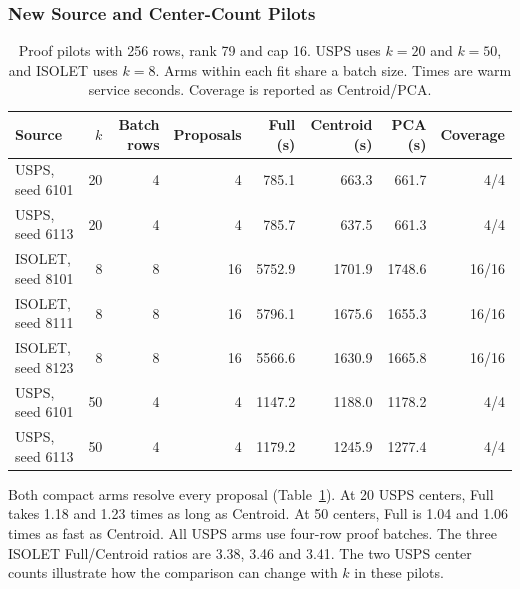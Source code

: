 \documentclass[5p,times,twocolumn]{elsarticle}
\begin{document}
\subsubsection{New Source and Center-Count Pilots}
\begin{table}[!t]
\centering\small
\caption{Proof pilots with 256 rows, rank 79 and cap 16.
USPS uses $k=20$ and $k=50$, and ISOLET uses $k=8$.
Arms within each fit share a batch size. Times are warm service seconds.
Coverage is reported as Centroid/PCA.}
\label{tab:new-fit-pilots}
\begin{tabular}{@{}lrrrrrrr@{}}\toprule
Source & $k$ & Batch rows & Proposals & Full (s) & Centroid (s) & PCA (s) & Coverage\\\midrule
USPS, seed 6101 & 20 & 4 & 4 & 785.1 & 663.3 & 661.7 & 4/4\\
USPS, seed 6113 & 20 & 4 & 4 & 785.7 & 637.5 & 661.3 & 4/4\\
ISOLET, seed 8101 & 8 & 8 & 16 & 5752.9 & 1701.9 & 1748.6 & 16/16\\
ISOLET, seed 8111 & 8 & 8 & 16 & 5796.1 & 1675.6 & 1655.3 & 16/16\\
ISOLET, seed 8123 & 8 & 8 & 16 & 5566.6 & 1630.9 & 1665.8 & 16/16\\
USPS, seed 6101 & 50 & 4 & 4 & 1147.2 & 1188.0 & 1178.2 & 4/4\\
USPS, seed 6113 & 50 & 4 & 4 & 1179.2 & 1245.9 & 1277.4 & 4/4\\
\bottomrule\end{tabular}
\end{table}

Both compact arms resolve every proposal
(Table~\ref{tab:new-fit-pilots}). At 20 USPS centers, Full takes
1.18 and 1.23 times as long as Centroid. At 50 centers, Full is
1.04 and 1.06 times as fast as Centroid. All USPS arms use
four-row proof batches. The three ISOLET Full/Centroid ratios
are 3.38, 3.46 and 3.41. The two USPS center counts illustrate
how the comparison can change with $k$ in these pilots.
\end{document}
